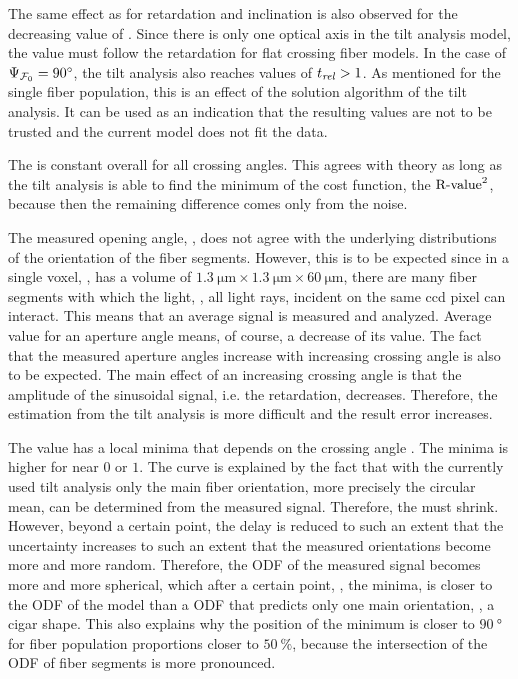 %
The same effect as for retardation and inclination is also observed for the decreasing value of \trel{}.
Since there is only one optical axis in the tilt analysis model, the \trel{} value must follow the retardation for flat crossing fiber models.
In the case of $\textnormal{$\Psi_{\textnormal{$\mathcal{F}_0$}}$}=\SI{90}{\degree}$, the tilt analysis also reaches values of $\textnormal{$t_\mathit{rel}$}>1$.
As mentioned for the single fiber population, this is an effect of the solution algorithm of the tilt analysis.
It can be used as an indication that the resulting values are not to be trusted and the current model does not fit the data.
\par
% 
The \rvalue{} is constant overall for all crossing angles.
This agrees with theory as long as the tilt analysis is able to find the minimum of the cost function, the $\textnormal{R-value}^2$, because then the remaining difference comes only from the noise.
\par
%
The measured opening angle, \openingAngle{}, does not agree with the underlying distributions of the orientation of the fiber segments.
However, this is to be expected since in a single voxel, \ie{}, has a volume of $\SI{1.3}{\micro\meter} \times \SI{1.3}{\micro\meter} \times \SI{60}{\micro\meter}$, there are many fiber segments with which the light, \ie{}, all light rays, incident on the same ccd pixel can interact.
This means that an average signal is measured and analyzed.
Average value for an aperture angle means, of course, a decrease of its value.
The fact that the measured aperture angles increase with increasing crossing angle is also to be expected.
The main effect of an increasing crossing angle is that the amplitude of the sinusoidal signal, i.e. the retardation, decreases.
Therefore, the estimation from the tilt analysis is more difficult and the result error increases.
% 
\par
The \accvalue{} value has a local minima that depends on the crossing angle \modelOmega{}.
The minima is higher for \modelPsi{} near $0$ or $1$.
The curve is explained by the fact that with the currently used tilt analysis only the main fiber orientation, more precisely the circular mean, can be determined from the measured signal.
Therefore, the \accvalue{} must shrink.
However, beyond a certain point, the delay is reduced to such an extent that the uncertainty increases to such an extent that the measured orientations become more and more random.
Therefore, the \ac{ODF} of the measured signal becomes more and more spherical, which after a certain point, \ie{}, the minima, is closer to the \ac{ODF} of the model than a \ac{ODF} that predicts only one main orientation, \ie{}, a cigar shape.
This also explains why the position of the minimum is closer to $\SI{90}{\degree}$ for fiber population proportions closer to $\SI{50}{\percent}$, because the intersection of the \ac{ODF} of fiber segments is more pronounced.
% 
% 
% 

